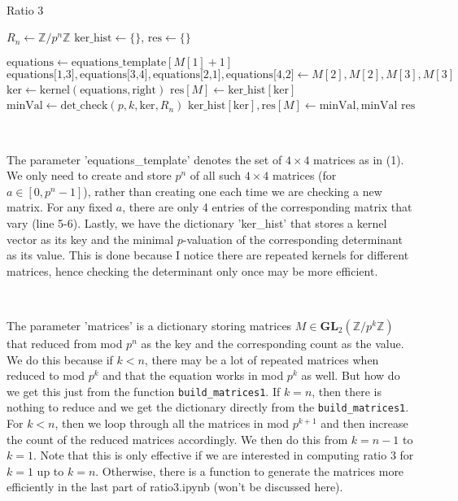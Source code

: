 \documentclass[letterpaper,12pt]{article}
\newcommand{\Z}{\mathbb{Z}}
\newcommand{\GL}{\mathbf {GL}}
\begin{document}
\

\begin{algorithm}[H]
\caption{Ratio 3}
\begin{algorithmic}[1]
\State $R_n \gets \Z/p^n\Z$
\State $\text{ker\_hist} \gets \{\}$,  $\text{res} \gets \{\}$ 

    \State $\text{equations} \gets \text{equations\_template}[M[1]+1]$
    \State $\text{equations[1,3]}, \text{equations[3,4]}, \text{equations[2,1]}, \text{equations[4,2]}\gets M[2], M[2], M[3], M[3]$
    \State $\text{ker} \gets \mathrm{kernel}(\text{equations}, \text{right})$
        \State $\text{res}[M] \gets \text{ker\_hist}[\text{ker}]$
    \Else
        \State $\text{minVal} \gets \mathrm{det\_check}(p, k, \text{ker}, R_n)$
        \State $\text{ker\_hist}[\text{ker}],\text{res}[M] \gets \text{minVal}, \text{minVal}$
    \EndIf
\EndFor
\State \Return $\text{res}$
\EndFunction
\end{algorithmic}
\end{algorithm}


\

The parameter 'equations\_template' denotes the set of $4\times4$ matrices as in (1).
We only need to create and store $p^n$ of all such $4 \times 4$ matrices (for $a \in [0, p^n-1]$),
rather than creating one each time we are checking a new matrix.
For any fixed $a$, there are only 4 entries of the corresponding matrix
that vary (line 5-6).
Lastly, we have the dictionary 'ker\_hist' that stores a kernel vector as its key and the minimal 
$p$-valuation of the corresponding determinant as its value. 
This is done because I notice there are repeated kernels for 
different matrices, hence checking the determinant only once may be more efficient.

\

The parameter 'matrices' is a dictionary storing matrices $M \in \GL_2(\Z/p^k\Z)$ that 
reduced from mod $p^n$ as the key and the corresponding count as the value.
We do this because if $k < n$, there may be a lot of repeated matrices
when reduced to mod $p^k$ and that the equation works in mod $p^k$ as well.
But how do we get this just from the function \texttt{build\_matrices1}.
If $k = n$, then there is nothing to reduce and we get the dictionary directly from the \texttt{build\_matrices1}.
For $k<n$, then we loop through all the matrices in mod $p^{k+1}$ 
and then increase the count of the reduced matrices accordingly.
We then do this from $k = n-1$ to $k = 1$.
Note that this is only effective if we are interested in computing ratio 3
for $k =1$ up to $k = n$. 
Otherwise, there is a function to generate the matrices more efficiently 
in the last part of ratio3.ipynb (won't be discussed here).
\end{document}
